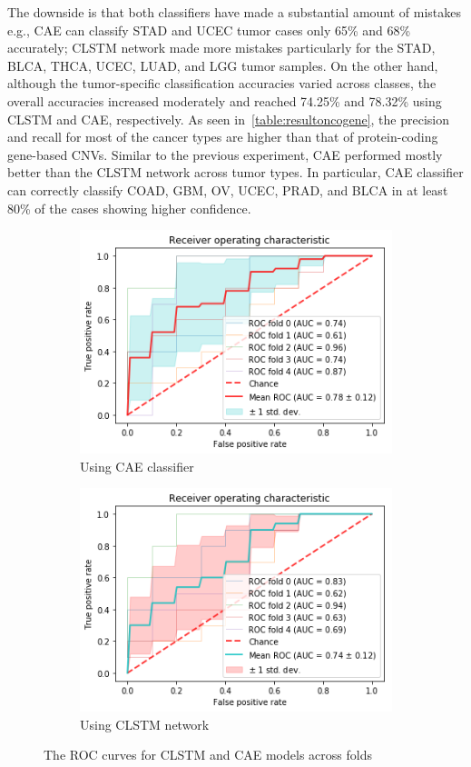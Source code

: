 \hspace*{3.5mm} The downside is that both classifiers have made a substantial amount of mistakes e.g., CAE can classify STAD and UCEC tumor cases only 65\% and 68\% accurately; CLSTM network made more mistakes particularly for the STAD, BLCA, THCA, UCEC, LUAD, and LGG tumor samples. On the other hand, although the tumor-specific classification accuracies varied across classes, the overall accuracies increased moderately and reached 74.25\% and 78.32\% using CLSTM and CAE, respectively. As seen in~\cref{table:resultoncogene}, the precision and recall for most of the cancer types are higher than that of protein-coding gene-based CNVs. Similar to the previous experiment, CAE performed mostly better than the CLSTM network across tumor types. In particular, CAE classifier can correctly classify COAD, GBM, OV, UCEC, PRAD, and BLCA in at least 80\% of the cases showing higher confidence. 

\begin{figure}[h]
	\centering
	\begin{subfigure}{0.48\linewidth}
		\centering
		\includegraphics[scale=0.55]{images/download1.png}
		\caption{Using CAE classifier}
	\end{subfigure}
	\hspace{2mm}
	\begin{subfigure}{0.48\linewidth}
		\centering
		\includegraphics[scale=0.55]{images/download2.png}
		\caption{Using CLSTM network}
	\end{subfigure}
	\caption{The ROC curves for CLSTM and CAE models across folds} 
	\label{fig:roc}
	 \vspace{-2mm}
\end{figure}


